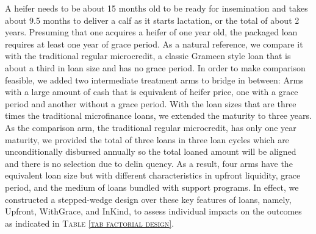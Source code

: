 	A heifer needs to be about 15 months old to be ready for insemination and takes about 9.5 months to deliver a calf as it starts lactation, or the total of about 2 years. Presuming that one acquires a heifer of one year old, the packaged loan requires at least one year of grace period. As a natural reference, we compare it with the traditional regular microcredit, a classic Grameen style loan that is about a third in loan size and has no grace period. In order to make comparison feasible, we added two intermediate treatment arms to bridge in between: Arms with a large amount of cash that is equivalent of heifer price, one with a grace period and another without a grace period. With the loan sizes that are three times the traditional microfinance loans, we extended the maturity to three years. As the comparison arm, the traditional regular microcredit, has only one year maturity, we provided the total of three loans in three loan cycles which are unconditionally disbursed annually so the total loaned amount will be aligned and there is no selection due to delin	quency. As a result, four arms have the equivalent loan size but with different characteristics in upfront liquidity, grace period, and the medium of loans bundled with support programs. In effect, we constructed a stepped-wedge design over these key features of loans, namely, \textsf{Upfront}, \textsf{WithGrace}, and \textsf{InKind}, to assess individual impacts on the outcomes as indicated in \textsc{\normalsize Table \ref{tab factorial design}}.

